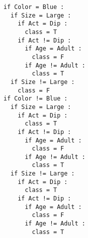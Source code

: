 \begin{verbatim}
if Color = Blue :
  if Size = Large :
    if Act = Dip :
      class = T
    if Act != Dip :
      if Age = Adult :
        class = F
      if Age != Adult :
        class = T  
  if Size != Large :
    class = F
if Color != Blue :
  if Size = Large :
    if Act = Dip :
      class = T
    if Act != Dip :
      if Age = Adult :
        class = F
      if Age != Adult :
        class = T  
  if Size != Large :
    if Act = Dip :
      class = T
    if Act != Dip :
      if Age = Adult :
        class = F
      if Age != Adult :
        class = T      
\end{verbatim}



